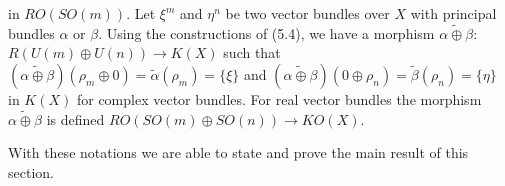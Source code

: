 in $RO(SO(m))$. Let $\xi^m$ and $\eta^n$ be two vector bundles over $X$ with principal bundles $\alpha$ or $\beta$. Using the constructions of (5.4), we have a morphism $\widetilde{\alpha \oplus \beta}$: $R(U(m) \oplus U(n)) \rightarrow K(X)$ such that $(\widetilde{\alpha \oplus \beta})(\rho_m \oplus 0) = \tilde{\alpha}(\rho_m) = \{\xi\}$ and $(\widetilde{\alpha \oplus \beta})(0 \oplus \rho_n) = \tilde{\beta}(\rho_n) = \{\eta\}$ in $K(X)$ for complex vector bundles. For real vector bundles the morphism $\widetilde{\alpha \oplus \beta}$ is defined $RO(SO(m) \oplus SO(n)) \rightarrow KO(X)$.

With these notations we are able to state and prove the main result of this section.
